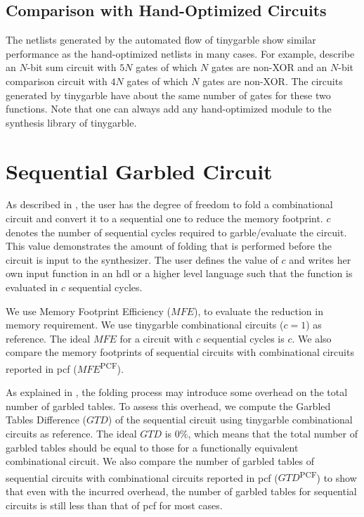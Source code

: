 \subsection{Comparison with Hand-Optimized Circuits}
The netlists generated by the automated flow of \gls{tinygarble} show similar performance as the hand-optimized netlists in many cases.
For example, \cite{kolesnikov2009improved} describe an $N$-bit sum circuit with $5N$ gates of which $N$ gates are non-XOR and an $N$-bit comparison circuit with $4N$ gates of which $N$ gates are non-XOR.
The circuits generated by \gls{tinygarble} have about the same number of gates for these two functions.
Note that one can always add any hand-optimized module to the synthesis library of \gls{tinygarble}.

\section{Sequential Garbled Circuit}
As described in , the user has the degree of freedom to fold a combinational circuit and convert it to a sequential one to reduce the memory footprint.
$c$ denotes the number of sequential cycles required to garble/evaluate the circuit.
This value demonstrates the amount of folding that is performed before the circuit is input to the synthesizer.
The user defines the value of $c$ and writes her own input function in an \acrshort{hdl} or a higher level language such that the function is evaluated in $c$ sequential cycles.

We use Memory Footprint Efficiency ($\mathit{MFE}$), to evaluate the reduction in memory requirement.
We use \gls{tinygarble} combinational circuits ($c=1$) as reference.
The ideal $\mathit{MFE}$ for a circuit with $c$ sequential cycles is $c$.
We also compare the memory footprints of sequential circuits with combinational circuits reported in \gls{pcf} ($\mathit{MFE}$\textsuperscript{PCF}).

As explained in , the folding process may introduce some overhead on the total number of garbled tables.
To assess this overhead, we compute the Garbled Tables Difference ($\mathit{GTD}$) of the sequential circuit using \gls{tinygarble} combinational circuits as reference.
The ideal $\mathit{GTD}$ is $0\%$, which means that the total number of garbled tables should be equal to those for a functionally equivalent combinational circuit.
We also compare the number of garbled tables of sequential circuits with combinational circuits reported in \gls{pcf} ($\mathit{GTD}$\textsuperscript{PCF}) to show that even with the incurred overhead, the number of garbled tables for sequential circuits is still less than that of \gls{pcf} for most cases.

